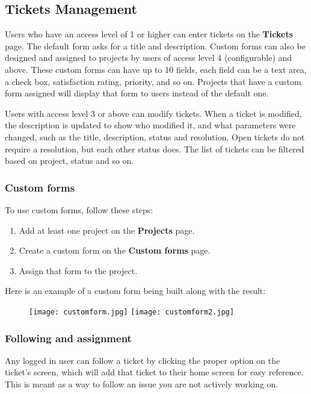 \documentclass[11pt]{article}
\begin{document}
\subsection{Tickets Management}
Users who have an access level of 1 or higher can enter tickets on the \textbf{Tickets} page. The default form asks for a title and description. Custom forms can also be designed and assigned to projects by users of access level 4 (configurable) and above. These custom forms can have up to 10 fields, each field can be a text area, a check box, satisfaction rating, priority, and so on. Projects that have a custom form assigned will display that form to users instead of the default one.

Users with access level 3 or above can modify tickets. When a ticket is modified, the description is updated to show who modified it, and what parameters were changed, such as the title, description, status and resolution. Open tickets do not require a resolution, but each other status does. The list of tickets can be filtered based on project, status and so on.

\subsubsection{Custom forms}
To use custom forms, follow these steps:

\begin{enumerate}
\item Add at least one project on the \textbf{Projects} page.
\item Create a custom form on the \textbf{Custom forms} page.
\item Assign that form to the project.
\end{enumerate}

Here is an example of a custom form being built along with the result:

\begin{figure}[h]
\texttt{[image: customform.jpg]}
\texttt{[image: customform2.jpg]}
\end{figure}

\subsubsection{Following and assignment}
Any logged in user can follow a ticket by clicking the proper option on the ticket's screen, which will add that ticket to their home screen for easy reference. This is meant as a way to follow an issue you are not actively working on.
\end{document}
